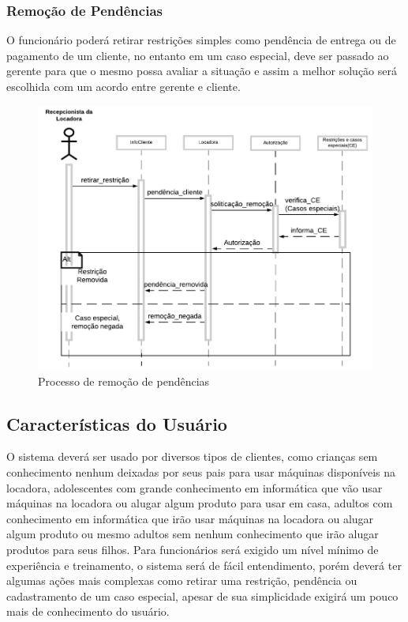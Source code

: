 \documentclass{article}
\begin{document}
         \subsubsection{Remoção de Pendências}
            O funcionário poderá retirar restrições simples como pendência de entrega ou de pagamento de um cliente, no entanto em um caso especial, deve ser passado ao gerente para que o mesmo possa avaliar a situação e assim a melhor solução será escolhida com um acordo entre gerente e cliente.
            \begin{figure}[h]
                \label{fig: Diagrama de sequência} 
                \centering
                \includegraphics[width=1\textwidth]{pictures/especiais.PNG} 
                \caption{Processo de remoção de pendências}
            \end{figure}
    
    \subsection{Características do Usuário}
    O sistema deverá ser usado por diversos tipos de clientes, como crianças sem conhecimento nenhum deixadas por seus pais para usar máquinas disponíveis na locadora, adolescentes com grande conhecimento em informática que vão usar máquinas na locadora ou alugar algum produto para usar em casa, adultos com conhecimento em informática que irão usar máquinas na locadora ou alugar algum produto ou mesmo adultos sem nenhum conhecimento que irão alugar produtos para seus filhos.\newline
    Para funcionários será exigido um nível mínimo de experiência e treinamento, o sistema será de fácil entendimento, porém deverá ter algumas ações mais complexas como retirar uma restrição, pendência ou cadastramento de um caso especial, apesar de sua simplicidade exigirá um pouco mais de conhecimento do usuário.
    
\end{document}
